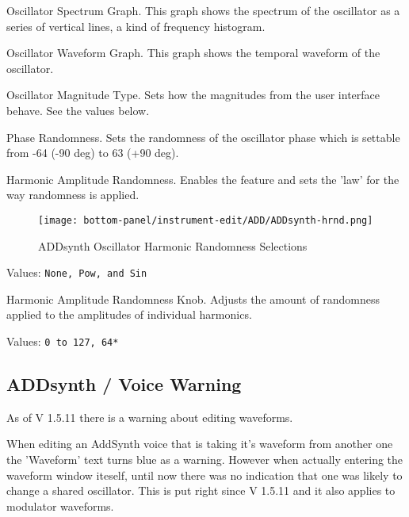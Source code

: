    \setcounter{ItemCounter}{0}      %

   Oscillator Spectrum Graph.
   This graph shows the spectrum of the oscillator as a series of vertical
   lines, a kind of frequency histogram.

   Oscillator Waveform Graph.
   This graph shows the temporal waveform  of the oscillator.

   Oscillator Magnitude Type.
   Sets how the magnitudes from the user interface behave.  See the values
   below.

   Phase Randomness. Sets the randomness of the oscillator phase which is settable
   from -64 (-90 deg) to 63 (+90 deg).

   Harmonic Amplitude Randomness.
   Enables the feature and sets the 'law' for the way randomness is applied.

\begin{figure}[H]
   \centering
   \texttt{[image: bottom-panel/instrument-edit/ADD/ADDsynth-hrnd.png]}
   \caption{ADDsynth Oscillator Harmonic Randomness Selections}
   \label{fig:addsynth_hrnd}
\end{figure}

   Values: \texttt{None, Pow, and Sin}

   Harmonic Amplitude Randomness Knob.
   Adjusts the amount of randomness applied to the amplitudes of individual harmonics.

   Values: \texttt{0 to 127, 64*}

\subsection{ADDsynth / Voice Warning}
\label{subsec:addsynth_voice-warning}
   As of V 1.5.11 there is a warning about editing waveforms.

   When editing an AddSynth voice that is taking it's waveform from another one
   the 'Waveform' text turns blue as a warning. However when actually entering
   the waveform window iteself, until now there was no indication that one was
   likely to change a shared oscillator. This is put right since V 1.5.11 and
   it also applies to modulator waveforms.

